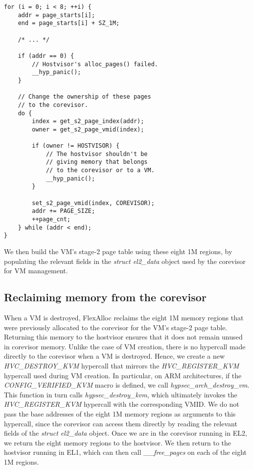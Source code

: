 \begin{verbatim}
for (i = 0; i < 8; ++i) {
    addr = page_starts[i];
    end = page_starts[i] + SZ_1M;

    /* ... */

    if (addr == 0) {
        // Hostvisor's alloc_pages() failed.
        __hyp_panic();
    }

    // Change the ownership of these pages
    // to the corevisor.
    do {
        index = get_s2_page_index(addr);
        owner = get_s2_page_vmid(index);

        if (owner != HOSTVISOR) {
            // The hostvisor shouldn't be
            // giving memory that belongs
            // to the corevisor or to a VM.
            __hyp_panic();
        }

        set_s2_page_vmid(index, COREVISOR);
        addr += PAGE_SIZE;
        ++page_cnt;
    } while (addr < end);
}
\end{verbatim}

\noindent We then build the VM's stage-2 page table using these eight 1M regions, by
populating the relevant fields in the \textit{struct el2\_data} object used
by the corevisor for VM management.

\subsection{Reclaiming memory from the corevisor}

When a VM is destroyed, FlexAlloc reclaims the eight 1M memory regions that were
previously allocated to the corevisor for the VM's stage-2 page table. Returning
this memory to the hostvisor ensures that it does not remain unused in corevisor
memory. Unlike the case of VM creation, there is no hypercall made directly to
the corevisor when a VM is destroyed. Hence, we create a new \textit{HVC\_DESTROY\_KVM}
hypercall that mirrors the \textit{HVC\_REGISTER\_KVM} hypercall used during VM
creation. In particular, on ARM architectures, if the \textit{CONFIG\_VERIFIED\_KVM} macro is defined,
we call \textit{hypsec\_arch\_destroy\_vm}. This function in turn calls \textit{hypsec\_destroy\_kvm},
which ultimately invokes the \textit{HVC\_REGISTER\_KVM} hypercall with the corresponding
VMID. We do not pass the base addresses of the eight 1M memory regions as arguments
to this hypercall, since the corevisor can access them directly by reading the
relevant fields of the \textit{struct el2\_data} object. Once we are in the
corevisor running in EL2, we return the eight memory regions to the hostvisor.
We then return to the hostvisor running in EL1, which can then call \textit{\_\_free\_pages}
on each of the eight 1M regions.

